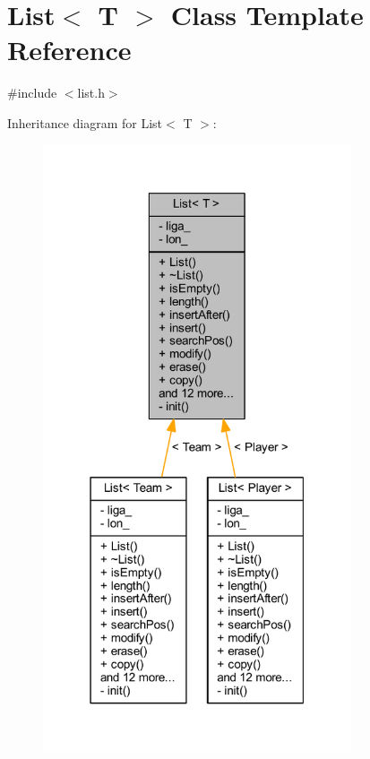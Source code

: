 \hypertarget{class_list}{}\section{List$<$ T $>$ Class Template Reference}
\label{class_list}


{\ttfamily \#include $<$list.\+h$>$}



Inheritance diagram for List$<$ T $>$\+:
\nopagebreak
\begin{figure}[H]
\begin{center}
\leavevmode
\includegraphics[width=258pt]{d6/da6/class_list__inherit__graph}
\end{center}
\end{figure}


